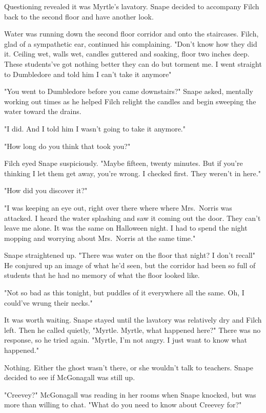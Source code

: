 Questioning revealed it was Myrtle's lavatory. Snape decided to accompany Filch back to the second floor and have another look.

Water was running down the second floor corridor and onto the staircases. Filch, glad of a sympathetic ear, continued his complaining. "Don't know how they did it. Ceiling wet, walls wet, candles guttered and soaking, floor two inches deep. These students've got nothing better they can do but torment me. I went straight to Dumbledore and told him I can't take it anymore{\el}"

"You went to Dumbledore before you came downstairs?" Snape asked, mentally working out times as he helped Filch relight the candles and begin sweeping the water toward the drains.

"I did. And I told him I wasn't going to take it anymore."

"How long do you think that took you?"

Filch eyed Snape suspiciously. "Maybe fifteen, twenty minutes. But if you're thinking I let them get away, you're wrong. I checked first. They weren't in here."

"How did you discover it?"

"I was keeping an eye out, right over there where{\el} where Mrs.~Norris was attacked. I heard the water splashing and saw it coming out the door. They can't leave me alone. It was the same on Halloween night. I had to spend the night mopping and worrying about Mrs.~Norris at the same time."

Snape straightened up. "There was water on the floor that night? I don't recall{\el}" He conjured up an image of what he'd seen, but the corridor had been so full of students that he had no memory of what the floor looked like.

"Not so bad as this tonight, but puddles of it everywhere all the same. Oh, I could've wrung their necks."

It was worth waiting. Snape stayed until the lavatory was relatively dry and Filch left. Then he called quietly, "Myrtle. Myrtle, what happened here?" There was no response, so he tried again. "Myrtle, I'm not angry. I just want to know what happened."

Nothing. Either the ghost wasn't there, or she wouldn't talk to teachers. Snape decided to see if McGonagall was still up.

"Creevey?" McGonagall was reading in her rooms when Snape knocked, but was more than willing to chat. "What do you need to know about Creevey for?"

